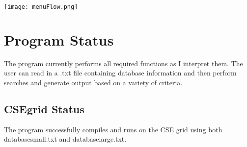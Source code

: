 \documentclass[11pt]{article}
\begin{document}
\vspace{.25cm}

\texttt{[image: menuFlow.png]}


\newpage


\section*{Program Status}

The program currently performs all required functions as I interpret them. The user can read in a .txt file containing
database information and then perform searches and generate output based on a variety of criteria.


\subsection*{CSEgrid Status}

The program successfully compiles and runs on the CSE grid using both databasesmall.txt and databaselarge.txt.
\end{document}
